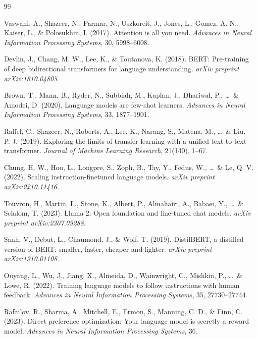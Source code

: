 \documentclass[12pt,twoside]{article}
\begin{document}
\begin{thebibliography}{99}


Vaswani, A., Shazeer, N., Parmar, N., Uszkoreit, J., Jones, L., Gomez, A. N., Kaiser, \L., \& Polosukhin, I. (2017). Attention is all you need. \textit{Advances in Neural Information Processing Systems}, 30, 5998--6008.

Devlin, J., Chang, M. W., Lee, K., \& Toutanova, K. (2018). BERT: Pre-training of deep bidirectional transformers for language understanding. \textit{arXiv preprint arXiv:1810.04805}.

Brown, T., Mann, B., Ryder, N., Subbiah, M., Kaplan, J., Dhariwal, P., \ldots\ \& Amodei, D. (2020). Language models are few-shot learners. \textit{Advances in Neural Information Processing Systems}, 33, 1877--1901.

Raffel, C., Shazeer, N., Roberts, A., Lee, K., Narang, S., Matena, M., \ldots\ \& Liu, P. J. (2019). Exploring the limits of transfer learning with a unified text-to-text transformer. \textit{Journal of Machine Learning Research}, 21(140), 1--67.

Chung, H. W., Hou, L., Longpre, S., Zoph, B., Tay, Y., Fedus, W., \ldots\ \& Le, Q. V. (2022). Scaling instruction-finetuned language models. \textit{arXiv preprint arXiv:2210.11416}.

Touvron, H., Martin, L., Stone, K., Albert, P., Almahairi, A., Babaei, Y., \ldots\ \& Scialom, T. (2023). Llama 2: Open foundation and fine-tuned chat models. \textit{arXiv preprint arXiv:2307.09288}.

Sanh, V., Debut, L., Chaumond, J., \& Wolf, T. (2019). DistilBERT, a distilled version of BERT: smaller, faster, cheaper and lighter. \textit{arXiv preprint arXiv:1910.01108}.


Ouyang, L., Wu, J., Jiang, X., Almeida, D., Wainwright, C., Mishkin, P., \ldots\ \& Lowe, R. (2022). Training language models to follow instructions with human feedback. \textit{Advances in Neural Information Processing Systems}, 35, 27730--27744.

Rafailov, R., Sharma, A., Mitchell, E., Ermon, S., Manning, C. D., \& Finn, C. (2023). Direct preference optimization: Your language model is secretly a reward model. \textit{Advances in Neural Information Processing Systems}, 36.


\end{thebibliography}
\end{document}
